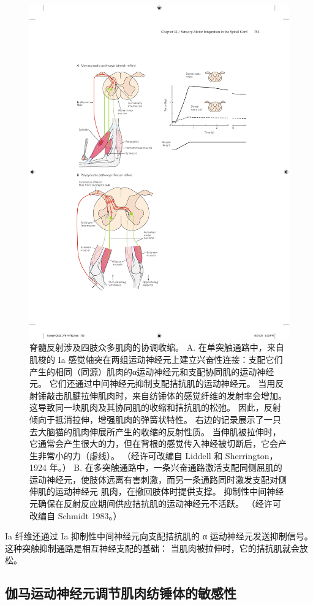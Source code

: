 \begin{figure}[htbp]
	\centering
	\includegraphics[width=0.75\linewidth]{chap32/fig_32_1}
	\caption{脊髓反射涉及四肢众多肌肉的协调收缩。
		A. 在单突触通路中，来自肌梭的 Ia 感觉轴突在两组运动神经元上建立兴奋性连接：支配它们产生的相同（同源）肌肉的α运动神经元和支配协同肌的运动神经元。 
		它们还通过中间神经元抑制支配拮抗肌的运动神经元。
		当用反射锤敲击肌腱拉伸肌肉时，来自纺锤体的感觉纤维的发射率会增加。
		这导致同一块肌肉及其协同肌的收缩和拮抗肌的松弛。
		因此，反射倾向于抵消拉伸，增强肌肉的弹簧状特性。
		右边的记录展示了一只去大脑猫的肌肉伸展所产生的收缩的反射性质。 当伸肌被拉伸时，它通常会产生很大的力，但在背根的感觉传入神经被切断后，它会产生非常小的力（虚线）。 （经许可改编自 Liddell 和 Sherrington，1924 年。）
		B. 在多突触通路中，一条兴奋通路激活支配同侧屈肌的运动神经元，使肢体远离有害刺激，而另一条通路同时激发支配对侧伸肌的运动神经元 肌肉，在撤回肢体时提供支撑。
		抑制性中间神经元确保在反射反应期间供应拮抗肌的运动神经元不活跃。 （经许可改编自 Schmidt 1983。）}
	\label{fig:32_1}
\end{figure}


Ia 纤维还通过 Ia 抑制性中间神经元向支配拮抗肌的 α 运动神经元发送抑制信号。
这种突触抑制通路是相互神经支配的基础：
当肌肉被拉伸时，它的拮抗肌就会放松。



\subsection{伽马运动神经元调节肌肉纺锤体的敏感性}

